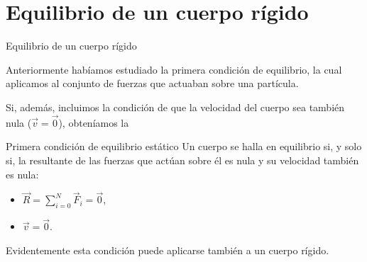 \documentclass[11pt,handout,aspectratio=1610]{beamer}
\newcommand{\vs}{\vspace{11pt}}
\begin{document}
\section{Equilibrio de un cuerpo rígido}

\begin{frame}{Equilibrio de un cuerpo rígido}

    Anteriormente habíamos estudiado la primera condición de equilibrio, la cual aplicamos al conjunto de fuerzas que actuaban sobre una partícula. 
    
    \vs 
    
    Si, además, incluimos la condición de que la velocidad del cuerpo sea también nula ($\vec{v} = \vec{0}$), obteníamos la 
    \begin{block}{Primera condición de equilibrio estático}
        Un cuerpo se halla en equilibrio si, y solo si, la resultante de las fuerzas que actúan sobre él es nula y su velocidad también es nula: 
        \begin{itemize}
            \item $\vec{R} = \sum\limits_{i=0}^{N} \vec{F}_i = \vec{0}$,
            \item $\vec{v} = \vec{0}$.
        \end{itemize}
    \end{block}  Evidentemente esta condición puede aplicarse también a un cuerpo rígido.
    
\end{frame}
\end{document}
